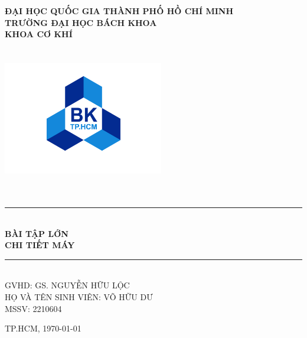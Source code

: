 \begin{titlepage}   
    \begin{center}
        \vspace*{-2cm} 
        \large
        \textbf{ĐẠI HỌC QUỐC GIA THÀNH PHỐ HỒ CHÍ MINH \\
        TRƯỜNG ĐẠI HỌC BÁCH KHOA\\
        KHOA CƠ KHÍ\\}
        \vspace{0.5cm}
        \includegraphics[width=70mm, height=70mm]{pictures/hcmut.png} \\
        \rule{\linewidth}{0.5mm}\\
        \vspace{1cm}
        \LARGE
        \textbf{BÀI TẬP LỚN}\\
        \vspace*{0.5cm}
        \Huge
        \textbf{CHI TIẾT MÁY}\\
        \vspace{0.5cm}
        \rule{\linewidth}{0.5mm}\\
        \vspace{0.8cm}
        \vspace{1cm}
        \large
        GVHD: GS. NGUYỄN HỮU LỘC\\[0.5cm]
        HỌ VÀ TÊN SINH VIÊN: VÕ HỮU DƯ\\[0.5cm]
        MSSV: 2210604\\
    \end{center}
        
    \vfill
    \large
    \begin{center}
        TP.HCM, \today
    \end{center}
\end{titlepage}